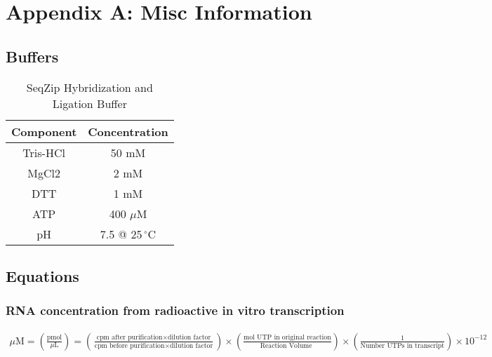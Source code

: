 \chapter{Appendix A: Misc Information} \label{AppendixMisc:Appendix: Misc Info} 


\section{Buffers}\label{AppendixMisc:sec:Buffers}

  \renewcommand{\arraystretch}{1}
    \begin{table}[ht]
    \centering
      \begin{tabular}[c]{c|c}
      Component & Concentration \\
        \hline
      Tris-HCl  & 50 mM         \\
        \hline
      MgCl2     & 2 mM          \\
        \hline
      DTT       & 1 mM          \\
        \hline
      ATP       & 400 $\mu$M        \\
        \hline
      pH        & 7.5 @ 25$\,^{\circ}\mathrm{C}$   
      \end{tabular}
    \caption[SeqZip Hybridization and Ligation Buffer]
      {
      SeqZip Hybridization and Ligation Buffer
      }
    \label{AppendixMisc:tbl: Rnl2 Buffer}
    \end{table}

\section{Equations}\label{AppendixMisc:sec: Equations}

\subsection{RNA concentration from radioactive in vitro transcription}

{
  \tiny{
    \begin{eqnarray*}
    \mu \mbox{M} = \left( \frac{\mbox{pmol}}{\mu\mbox{L}}\right)
          = \left( \frac{\mbox{cpm after purification} \times \mbox{dilution factor}}{\mbox{cpm before purification} \times \mbox{dilution factor}} \right)
          \times \left( \frac{\mbox{mol UTP in original reaction}}{\mbox{Reaction Volume }} \right) \times \left( \frac{1}{\mbox{Number UTPs in transcript}} \right) \times 10^{-12} 
    \end{eqnarray*}
  }
}

